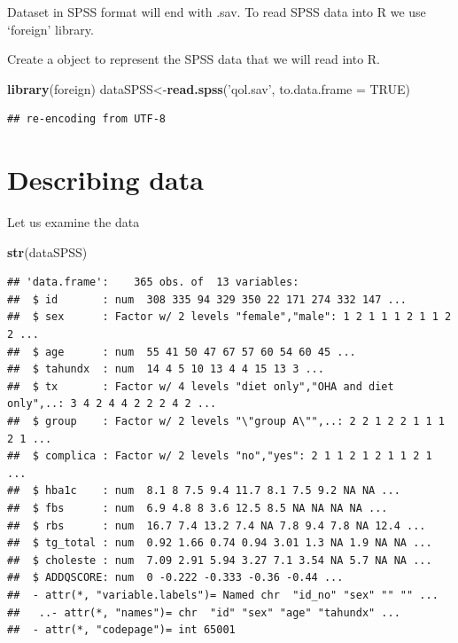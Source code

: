 \documentclass[]{book}
\newenvironment{Shaded}{\begin{snugshade}}{\end{snugshade}}
\newcommand{\KeywordTok}[1]{\textcolor[rgb]{0.13,0.29,0.53}{\textbf{#1}}}
\newcommand{\DataTypeTok}[1]{\textcolor[rgb]{0.13,0.29,0.53}{#1}}
\newcommand{\StringTok}[1]{\textcolor[rgb]{0.31,0.60,0.02}{#1}}
\newcommand{\OtherTok}[1]{\textcolor[rgb]{0.56,0.35,0.01}{#1}}
\newcommand{\NormalTok}[1]{#1}
\theoremstyle{definition}
\theoremstyle{definition}
\theoremstyle{remark}
\begin{document}
Dataset in SPSS format will end with .sav. To read SPSS data into R we
use `foreign' library.

Create a object to represent the SPSS data that we will read into R.

\begin{Shaded}
\begin{Highlighting}[]
\KeywordTok{library}\NormalTok{(foreign)}
\NormalTok{dataSPSS<-}\KeywordTok{read.spss}\NormalTok{(}\StringTok{'qol.sav'}\NormalTok{, }\DataTypeTok{to.data.frame =} \OtherTok{TRUE}\NormalTok{)}
\end{Highlighting}
\end{Shaded}

\begin{verbatim}
## re-encoding from UTF-8
\end{verbatim}

\section{Describing data}\label{describing-data}

Let us examine the data

\begin{Shaded}
\begin{Highlighting}[]
\KeywordTok{str}\NormalTok{(dataSPSS)}
\end{Highlighting}
\end{Shaded}

\begin{verbatim}
## 'data.frame':    365 obs. of  13 variables:
##  $ id       : num  308 335 94 329 350 22 171 274 332 147 ...
##  $ sex      : Factor w/ 2 levels "female","male": 1 2 1 1 1 2 1 1 2 2 ...
##  $ age      : num  55 41 50 47 67 57 60 54 60 45 ...
##  $ tahundx  : num  14 4 5 10 13 4 4 15 13 3 ...
##  $ tx       : Factor w/ 4 levels "diet only","OHA and diet only",..: 3 4 2 4 4 2 2 2 4 2 ...
##  $ group    : Factor w/ 2 levels "\"group A\"",..: 2 2 1 2 2 1 1 1 2 1 ...
##  $ complica : Factor w/ 2 levels "no","yes": 2 1 1 2 1 2 1 1 2 1 ...
##  $ hba1c    : num  8.1 8 7.5 9.4 11.7 8.1 7.5 9.2 NA NA ...
##  $ fbs      : num  6.9 4.8 8 3.6 12.5 8.5 NA NA NA NA ...
##  $ rbs      : num  16.7 7.4 13.2 7.4 NA 7.8 9.4 7.8 NA 12.4 ...
##  $ tg_total : num  0.92 1.66 0.74 0.94 3.01 1.3 NA 1.9 NA NA ...
##  $ choleste : num  7.09 2.91 5.94 3.27 7.1 3.54 NA 5.7 NA NA ...
##  $ ADDQSCORE: num  0 -0.222 -0.333 -0.36 -0.44 ...
##  - attr(*, "variable.labels")= Named chr  "id_no" "sex" "" "" ...
##   ..- attr(*, "names")= chr  "id" "sex" "age" "tahundx" ...
##  - attr(*, "codepage")= int 65001
\end{verbatim}
\end{document}
